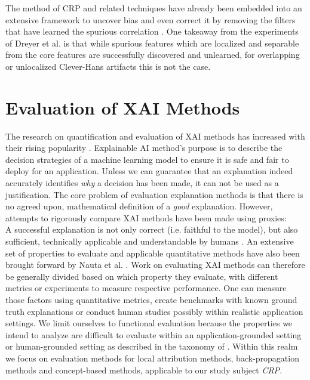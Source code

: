 The method of CRP and related techniques have already been embedded into an extensive framework to uncover bias and even correct it by removing the filters that have learned the spurious correlation \cite{Pahde2023,Dreyer2023,Dreyer2023a}. One takeaway from the experiments of Dreyer et al. \cite{Dreyer2023a} is that while spurious features which are localized and separable from the core features are successfully discovered and unlearned, for overlapping or unlocalized Clever-Hans artifacts this is not the case. 

\section{Evaluation of XAI Methods}
The research on quantification and evaluation of XAI methods has increased with their rising popularity \cite{Nauta2023}. 
Explainable AI method's purpose is to describe the decision strategies of a machine learning model to ensure it is safe and fair to deploy for an application. 
Unless we can guarantee that an explanation indeed accurately identifies \textit{why} a decision has been made, it can not be used as a justification.
The core problem of evaluation explanation methods is that there is no agreed upon, mathematical definition of a \textit{good} explanation. However, attempts to rigorously compare XAI methods have been made using proxies:\\

A successful explanation is not only correct (i.e. faithful to the model), but also sufficient, technically applicable and understandable by humans \cite{Samek2021}. An extensive set of properties to evaluate and applicable quantitative methods have also been brought forward by Nauta et al. \cite{Nauta2023}. Work on evaluating XAI methods can therefore be generally divided based on which property they evaluate, with different metrics or experiments to measure respective performance. One can measure those factors using quantitative metrics, create benchmarks with known ground truth explanations or conduct human studies possibly within realistic application settings. We limit ourselves to functional evaluation because the properties we intend to analyze are difficult to evaluate within an application-grounded setting or human-grounded setting as described in the taxonomy of \cite{Nauta2023}. Within this realm we focus on evaluation methods for local attribution methods, back-propagation methods and concept-based methods, applicable to our study subject \textit{CRP}. 

